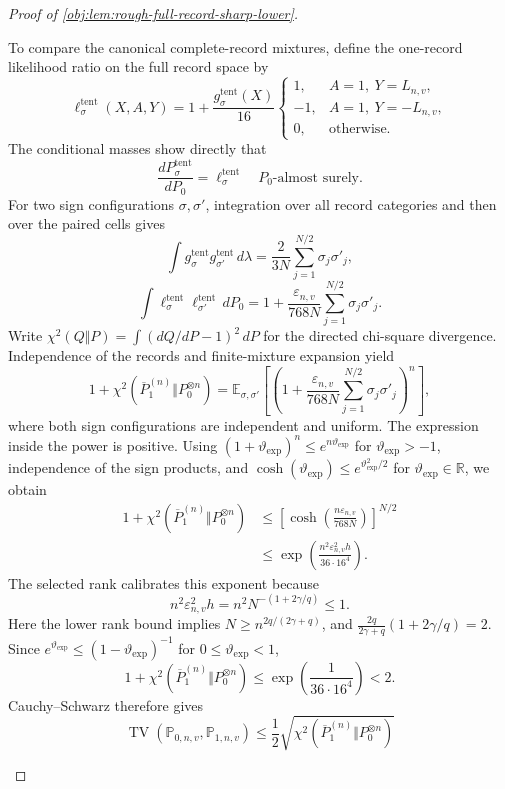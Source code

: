 \documentclass[11pt]{article}
\begin{document}
\begin{proof}[Proof of \cref{obj:lem:rough-full-record-sharp-lower}]
\begin{enumerate}
To compare the canonical complete-record mixtures, define the one-record likelihood ratio on the full record space by
\[
\ell^{\mathrm{tent}}_\sigma(X,A,Y)
=1+\frac{g^{\mathrm{tent}}_\sigma(X)}{16}
\begin{cases}
1,&A=1,\ Y=L_{n,v},\\
-1,&A=1,\ Y=-L_{n,v},\\
0,&\text{otherwise}.
\end{cases}
\]
The conditional masses show directly that
\[
\frac{dP^{\mathrm{tent}}_\sigma}{dP_0}
=\ell^{\mathrm{tent}}_\sigma
\quad P_0\text{-almost surely}.
\]
For two sign configurations \(\sigma,\sigma'\), integration over all record categories and then over the paired cells gives
\[
\int g^{\mathrm{tent}}_\sigma
 g^{\mathrm{tent}}_{\sigma'}\,d\lambda
=\frac{2}{3N}\sum_{j=1}^{N/2}\sigma_j\sigma'_j,
\]
\[
\int\ell^{\mathrm{tent}}_\sigma
\ell^{\mathrm{tent}}_{\sigma'}\,dP_0
=1+\frac{\varepsilon_{n,v}}{768N}
\sum_{j=1}^{N/2}\sigma_j\sigma'_j.
\]
Write \(\chi^2(Q\Vert P)=\int(dQ/dP-1)^2\,dP\) for the directed chi-square divergence. Independence of the records and finite-mixture expansion yield
\[
1+\chi^2(\overline P_1^{(n)}\Vert P_0^{\otimes n})
=\mathbb E_{\sigma,\sigma'}
\left[
\left(1+\frac{\varepsilon_{n,v}}{768N}
\sum_{j=1}^{N/2}\sigma_j\sigma'_j\right)^n
\right],
\]
where both sign configurations are independent and uniform.
The expression inside the power is positive. Using
\((1+\vartheta_{\mathrm{exp}})^n\le e^{n\vartheta_{\mathrm{exp}}}\) for \(\vartheta_{\mathrm{exp}}>-1\), independence of the sign products, and
\(\cosh(\vartheta_{\mathrm{exp}})\le e^{\vartheta_{\mathrm{exp}}^2/2}\) for \(\vartheta_{\mathrm{exp}}\in\mathbb R\), we obtain
\[
\begin{aligned}
1+\chi^2(\overline P_1^{(n)}\Vert P_0^{\otimes n})
&\le
\left[\cosh\!\left(\frac{n\varepsilon_{n,v}}{768N}\right)\right]^{N/2}\\
&\le
\exp\!\left(\frac{n^2\varepsilon_{n,v}^2h}{36\cdot16^4}\right).
\end{aligned}
\]
The selected rank calibrates this exponent because
\[
n^2\varepsilon_{n,v}^2h
=n^2N^{-(1+2\gamma/q)}\le1.
\]
Here the lower rank bound implies
\(N\ge n^{2q/(2\gamma+q)}\), and
\(\frac{2q}{2\gamma+q}(1+2\gamma/q)=2\).
Since \(e^{\vartheta_{\mathrm{exp}}}\le(1-\vartheta_{\mathrm{exp}})^{-1}\) for \(0\le\vartheta_{\mathrm{exp}}<1\),
\[
1+\chi^2(\overline P_1^{(n)}\Vert P_0^{\otimes n})
\le\exp\!\left(\frac1{36\cdot16^4}\right)<2.
\]
Cauchy--Schwarz therefore gives
\[
\operatorname{TV}(\mathbb P_{0,n,v},\mathbb P_{1,n,v})
\le\frac12
\sqrt{\chi^2(\overline P_1^{(n)}\Vert P_0^{\otimes n})}
\]
\end{enumerate}
\end{proof}
\end{document}
